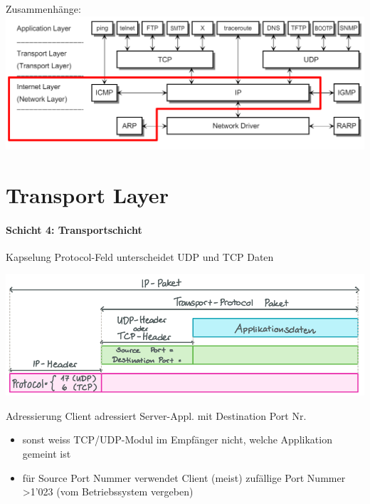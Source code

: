 \begin{KR}{Zusammenhänge:}\\
    \includegraphics[width=1\linewidth]{images/orientierung_network_layer.png}
    \end{KR}

\section{Transport Layer}
\paragraph{Schicht 4: Transportschicht}

\begin{definition}{Kapselung} Protocol-Feld unterscheidet UDP und TCP Daten
    
    \includegraphics[width=1\linewidth, height=0.3\linewidth]{images/tcp_udp_header.png}
\end{definition}

\begin{concept}{Adressierung}
    {\small Client adressiert Server-Appl. mit Destination Port Nr.}
    \begin{itemize}
        \item sonst weiss TCP/UDP-Modul im Empfänger nicht, welche Applikation gemeint ist
        \item für Source Port Nummer verwendet Client (meist) zufällige Port Nummer >1'023 (vom Betriebssystem vergeben)
    \end{itemize}
\end{concept}


